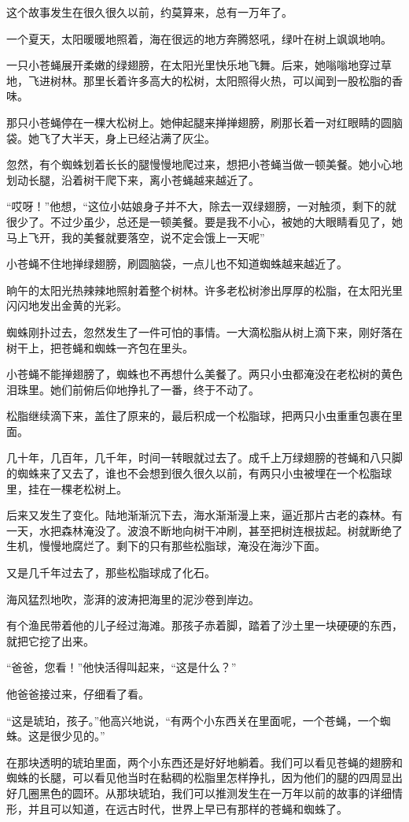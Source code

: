 \documentclass[12pt,UTF-8,openany]{ctexbook}
\begin{document}
\begin{large}
    
    这个故事发生在很久很久以前，约莫算来，总有一万年了。
    
    一个夏天，太阳暖暖地照着，海在很远的地方奔腾怒吼，绿叶在树上飒飒地响。
    
    一只小苍蝇展开柔嫩的绿翅膀，在太阳光里快乐地飞舞。后来，她嗡嗡地穿过草地，飞进树林。那里长着许多高大的松树，太阳照得火热，可以闻到一股松脂的香味。
    
    那只小苍蝇停在一棵大松树上。她伸起腿来掸掸翅膀，刷那长着一对红眼睛的圆脑袋。她飞了大半天，身上已经沾满了灰尘。
    
    忽然，有个蜘蛛划着长长的腿慢慢地爬过来，想把小苍蝇当做一顿美餐。她小心地划动长腿，沿着树干爬下来，离小苍蝇越来越近了。
    
    “哎呀！”他想，“这位小姑娘身子并不大，除去一双绿翅膀，一对触须，剩下的就很少了。不过少虽少，总还是一顿美餐。要是我不小心，被她的大眼睛看见了，她马上飞开，我的美餐就要落空，说不定会饿上一天呢”
    
    小苍蝇不住地掸绿翅膀，刷圆脑袋，一点儿也不知道蜘蛛越来越近了。
    
    晌午的太阳光热辣辣地照射着整个树林。许多老松树渗出厚厚的松脂，在太阳光里闪闪地发出金黄的光彩。
    
    蜘蛛刚扑过去，忽然发生了一件可怕的事情。一大滴松脂从树上滴下来，刚好落在树干上，把苍蝇和蜘蛛一齐包在里头。
    
    小苍蝇不能掸翅膀了，蜘蛛也不再想什么美餐了。两只小虫都淹没在老松树的黄色泪珠里。她们前俯后仰地挣扎了一番，终于不动了。
    
    松脂继续滴下来，盖住了原来的，最后积成一个松脂球，把两只小虫重重包裹在里面。
    
    几十年，几百年，几千年，时间一转眼就过去了。成千上万绿翅膀的苍蝇和八只脚的蜘蛛来了又去了，谁也不会想到很久很久以前，有两只小虫被埋在一个松脂球里，挂在一棵老松树上。
    
    后来又发生了变化。陆地渐渐沉下去，海水渐渐漫上来，逼近那片古老的森林。有一天，水把森林淹没了。波浪不断地向树干冲刷，甚至把树连根拔起。树就断绝了生机，慢慢地腐烂了。剩下的只有那些松脂球，淹没在海沙下面。
    
    又是几千年过去了，那些松脂球成了化石。
    
    海风猛烈地吹，澎湃的波涛把海里的泥沙卷到岸边。
    
    有个渔民带着他的儿子经过海滩。那孩子赤着脚，踏着了沙土里一块硬硬的东西，就把它挖了出来。
    
    “爸爸，您看！”他快活得叫起来，“这是什么？”
    
    他爸爸接过来，仔细看了看。
    
    “这是琥珀，孩子。”他高兴地说，“有两个小东西关在里面呢，一个苍蝇，一个蜘蛛。这是很少见的。”
    
    在那块透明的琥珀里面，两个小东西还是好好地躺着。我们可以看见苍蝇的翅膀和蜘蛛的长腿，可以看见他当时在黏稠的松脂里怎样挣扎，因为他们的腿的四周显出好几圈黑色的圆环。从那块琥珀，我们可以推测发生在一万年以前的故事的详细情形，并且可以知道，在远古时代，世界上早已有那样的苍蝇和蜘蛛了。
    
\end{large}
\end{document}
